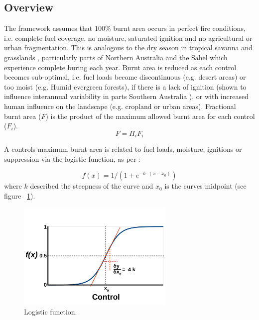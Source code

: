 \subsection{Overview}

The framework assumes that 100\% burnt area occurs in perfect fire conditions,  i.e. complete fuel coverage, no moisture, saturated ignition and no agricultural or urban fragmentation. This is analogous to the dry season in tropical savanna and grasslands \citep{kelley2014modelling}, particularly parts of Northern Australia \citep{murphy2013fire} and the Sahel \citep{van2008climate} which experience complete buring each year.
Burnt area is reduced as each control becomes sub-optimal, i.e.
    fuel loads become discontinuous  (e.g. desert areas)
    or too moist (e.g. Humid evergreen forests),
    if there is a lack of ignition (shown to influence interannual variability in parts Southern Australia \cite{bradstock2010biogeographic} ),
    or with increased human influence on the landscape (e.g. cropland or urban areas).
Fractional burnt area ($F$) is the product of the maximum allowed burnt area for each control ($F_i$).
\begin{equation}
    F=\Pi_{i} F_i
    \label{equ:LimFIRE}
\end{equation}

A controls maximum burnt area is related to fuel loads, moisture, ignitions or suppression via the logistic function, as per \citet{bistinas2014causal}:

\begin{equation}
    f(x) = 1 / (1 + e^{-k \cdot (x - x_0)})
    \label{equ:fx}
\end{equation}
where $k$ described the steepness of the curve and $x_0$ is the curves midpoint (see figure ~\ref{fig:Logistic_fun}).

\begin{figure}[!ht]
  \centering
    \includegraphics[width=0.67\textwidth]{diagrams/Logistic_fun.pdf}
  \caption{Logistic function.}
  \label{fig:Logistic_fun}
\end{figure}

